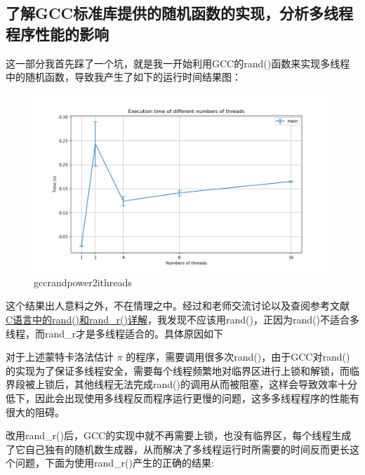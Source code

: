 \documentclass{LabReport}
\begin{document}
	\subsection{了解GCC标准库提供的随机函数的实现，分析多线程程序性能的影响}
	这一部分我首先踩了一个坑，就是我一开始利用GCC的rand()函数来实现多线程中的随机函数，导致我产生了如下的运行时间结果图：
	
\begin{figure}[h!]
	\centering
	\includegraphics[width=1\linewidth]{figures/GccRand_power(2,i)threads}
	\caption{gccrandpower2ithreads}
	\label{fig:gccrandpower2ithreads}
\end{figure}
	
	这个结果出人意料之外，不在情理之中。经过和老师交流讨论以及查阅参考文献\href{https://www.jb51.net/article/232332.htm}{\color{blue} C语言中的rand()和rand\_r()详解}，我发现不应该用rand()，正因为rand()不适合多线程，而rand\_r才是多线程适合的。具体原因如下\par
	\hspace{0em}对于上述蒙特卡洛法估计 $\pi$ 的程序，需要调用很多次rand()，由于GCC对rand()的实现为了保证多线程安全，需要每个线程频繁地对临界区进行上锁和解锁，而临界段被上锁后，其他线程无法完成rand()的调用从而被阻塞，这样会导致效率十分低下，因此会出现使用多线程反而程序运行更慢的问题，这多多线程程序的性能有很大的阻碍。\par
	\hspace{0em}改用rand\_r()后，GCC的实现中就不再需要上锁，也没有临界区，每个线程生成了它自己独有的随机数生成器，从而解决了多线程运行时所需要的时间反而更长这个问题，下面为使用rand\_r()产生的正确的结果:
	
\end{document}
